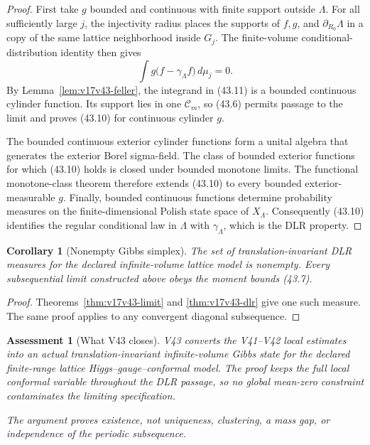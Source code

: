 \documentclass[11pt]{article}
\newtheorem{corollary}[theorem]{Corollary}
\newtheorem{assessment}[theorem]{Assessment}
\theoremstyle{remark}
\begin{document}
\begin{proof}
First take \(g\) bounded and continuous with finite support outside
\(\Lambda\).  For all sufficiently large \(j\), the injectivity radius
places the supports of \(f,g\), and
\(\partial_{R_0}\Lambda\) in a copy of the same lattice neighborhood
inside \(G_j\).  The finite-volume conditional-distribution identity
then gives
\[
 \int g\bigl(f-\gamma_\Lambda f\bigr)\,d\mu_j=0.   \tag{43.11}
\]
By Lemma~\ref{lem:v17v43-feller}, the integrand in (43.11) is a bounded
continuous cylinder function.  Its support lies in one
\(\mathcal C_m\), so (43.6) permits passage to the limit and proves
(43.10) for continuous cylinder \(g\).

The bounded continuous exterior cylinder functions form a unital
algebra that generates the exterior Borel sigma-field.  The class of
bounded exterior functions for which (43.10) holds is closed under
bounded monotone limits.  The functional monotone-class theorem
therefore extends (43.10) to every bounded exterior-measurable \(g\).
Finally, bounded continuous functions determine probability measures
on the finite-dimensional Polish state space of \(X_\Lambda\).
Consequently (43.10) identifies the regular conditional law in
\(\Lambda\) with \(\gamma_\Lambda\), which is the DLR property.
\end{proof}

\begin{corollary}[Nonempty Gibbs simplex]
\label{cor:v17v43-nonempty}
The set of translation-invariant DLR measures for the declared
infinite-volume lattice model is nonempty.  Every subsequential limit
constructed above obeys the moment bounds (43.7).
\end{corollary}

\begin{proof}
Theorems~\ref{thm:v17v43-limit} and
\ref{thm:v17v43-dlr} give one such measure.  The same proof applies to
any convergent diagonal subsequence.
\end{proof}

\begin{assessment}[What V43 closes]
\label{ass:v17v43-status}
V43 converts the V41--V42 local estimates into an actual
translation-invariant infinite-volume Gibbs state for the declared
finite-range lattice Higgs--gauge--conformal model.  The proof keeps
the full local conformal variable throughout the DLR passage, so no
global mean-zero constraint contaminates the limiting specification.

The argument proves existence, not uniqueness, clustering, a mass gap,
or independence of the periodic subsequence.
\end{assessment}
\end{document}
